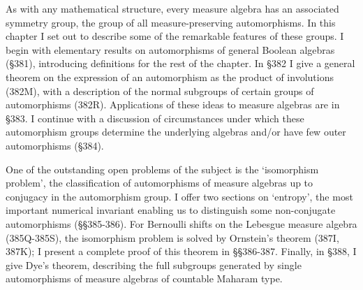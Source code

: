 
\def\chaptername{Automorphism groups} 
 
 
As with any mathematical structure, every measure algebra has an 
associated symmetry group, the group of all measure-preserving 
automorphisms.   In this chapter I set out to describe some of the 
remarkable features of these groups.   I begin with elementary results 
on automorphisms of general Boolean algebras (\S381), introducing 
definitions for the rest of the chapter.   In \S382 I give a general 
theorem on the expression of an automorphism as the product of 
involutions (382M), with a description of the normal subgroups of 
certain groups of automorphisms (382R). 
Applications of these ideas to measure algebras are in \S383. 
I continue 
with a discussion of circumstances under which these automorphism groups 
determine the underlying algebras and/or have few outer automorphisms 
(\S384). 
 
One of the outstanding open problems of the subject is the `isomorphism 
problem', the classification of 
automorphisms of measure algebras up to conjugacy in the automorphism 
group.   I offer two sections on `entropy', the most important numerical 
invariant enabling us to distinguish some non-conjugate automorphisms 
(\S\S385-386).   For Bernoulli shifts on the Lebesgue measure algebra 
(385Q-385S), %
the isomorphism problem is solved by Ornstein's theorem (387I, 387K);  I 
present a complete proof of this theorem in \S\S386-387.   Finally, in 
\S388, I give Dye's theorem, describing the full subgroups generated by 
single automorphisms of measure algebras of countable Maharam type. 
 
\discrpage 
 
